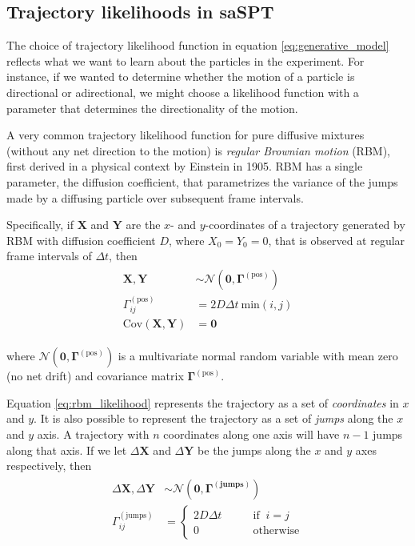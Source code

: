 \documentclass{article}
\renewcommand{\vec}{\mathbf}
\begin{document}
\subsection{Trajectory likelihoods in saSPT}

The choice of trajectory likelihood function in equation \ref{eq:generative_model} 
reflects what we want to learn about the particles in the experiment. For instance, 
if we wanted to determine whether the motion of a particle is directional or 
adirectional, we might choose a likelihood function with a parameter that determines
the directionality of the motion. \newline

A very common trajectory likelihood function for pure diffusive mixtures (without any
net direction to the motion) is \emph{regular Brownian motion} (RBM), first derived in a 
physical context by Einstein in 1905. RBM has a single parameter,
the diffusion coefficient, that parametrizes the variance of the jumps made by a 
diffusing particle over subsequent frame intervals. \newline

Specifically, if $\vec{X}$ and $\vec{Y}$ are the $x$- and $y$-coordinates of a
trajectory generated by RBM with diffusion coefficient $D$, where $X_{0} = Y_{0} = 0$, 
that is observed at regular frame intervals of $\Delta t$, then 
\begin{align}\begin{split}\label{eq:rbm_likelihood}
	\vec{X}, \vec{Y} &\sim \mathcal{N} \left( \vec{0}, \boldsymbol{\Gamma}^{(\text{pos})} \right) \\
	\Gamma_{ij}^{(\text{pos})} &= 2 D \Delta t \: \text{min} \left( i, j \right) \\
	\text{Cov} \left( \vec{X}, \vec{Y} \right) &= \vec{0} 
\end{split}\end{align}

where $\mathcal{N} \left( \vec{0}, \boldsymbol{\Gamma}^{(\text{pos})} \right)$ is a multivariate
normal random variable with mean zero (no net drift) and covariance matrix 
$\boldsymbol{\Gamma}^{(\text{pos})}$. \newline

Equation \ref{eq:rbm_likelihood} represents the trajectory as a set of \emph{coordinates}
in $x$ and $y$. It is also possible to represent the trajectory as a set of \emph{jumps}
along the $x$ and $y$ axis. A trajectory with $n$ coordinates along one axis 
will have $n - 1$ jumps along that axis. If we let $\Delta \vec{X}$ and $\Delta \vec{Y}$
be the jumps along the $x$ and $y$ axes respectively, then 
\begin{align}\begin{split}\label{eq:rbm_likelihood_jumps}
	\Delta \vec{X}, \Delta \vec{Y} &\sim \mathcal{N} \left( 
		\vec{0},
		\boldsymbol{\Gamma^{(\text{jumps})}}
	\right) \\
	\Gamma^{(\text{jumps})}_{ij} &= \begin{cases}
		2 D \Delta t \qquad &\text{if  } \: i = j \\
		0 \qquad &\text{otherwise}
	\end{cases}
\end{split}\end{align}
\end{document}
